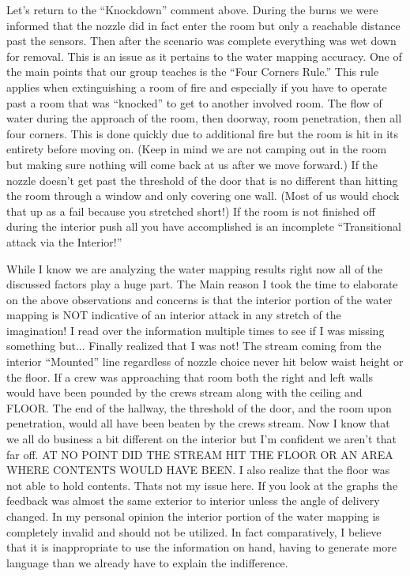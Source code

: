 \documentclass[12pt,oneside]{book}
\begin{document}
\begin{appendix}
 
Let's return to the ``Knockdown'' comment above.  During the burns we were informed that the nozzle did in fact enter the room but only a reachable distance past the sensors.  Then after the scenario was complete everything was wet down for removal.  This is an issue as it pertains to the water mapping accuracy.  One of the main points that our group teaches is the ``Four Corners Rule.''  This rule applies when extinguishing a room of fire and especially if you have to operate past a room that was ``knocked'' to get to another involved room.  The flow of water during the approach of the room, then doorway,  room penetration, then all four corners.  This is done quickly due to additional fire but the room is hit in its entirety before moving on.  (Keep in mind we are not camping out in the room but making sure nothing will come back at us after we move forward.)  If the nozzle doesn't get past the threshold of the door that is no different than hitting the room through a window and only covering one wall.  (Most of us would chock that up as a fail because you stretched short!)  If the room is not finished off during the interior push all you have accomplished is an incomplete ``Transitional attack via the Interior!''
 
While I know we are analyzing the water mapping results right now all of the discussed factors play a huge part.  The Main reason I took the time to elaborate on the above observations and concerns is that the interior portion of the water mapping is NOT indicative of an interior attack in any stretch of the imagination!  I read over the information multiple times to see if I was missing something but... Finally realized that I was not!  The stream coming from the interior ``Mounted'' line regardless of nozzle choice never hit below waist height or the floor.  If a crew was approaching that room both the right and left walls would have been pounded by the crews stream along with the ceiling and FLOOR.  The end of the hallway, the threshold of the door, and the room upon penetration, would all have been beaten by the crews stream.  Now I know that we all do business a bit different on the interior but I'm confident we aren't that far off.  AT NO POINT DID THE STREAM HIT THE FLOOR OR AN AREA WHERE CONTENTS WOULD HAVE BEEN.  I also realize that the floor was not able to hold contents.  Thats not my issue here.  If you look at the graphs the feedback was almost the same exterior to interior unless the angle of delivery changed.  In my personal opinion the interior portion of the water mapping is completely invalid and should not be utilized.  In fact comparatively, I believe that it is inappropriate to use the information on hand, having to generate more language than we already have to explain the indifference. 
 

\end{appendix}
\end{document}
